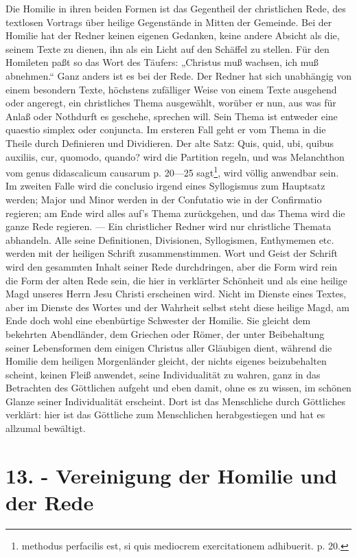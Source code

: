 Die Homilie in ihren beiden Formen ist das Gegentheil der christlichen Rede, des textlosen Vortrags über heilige Gegenstände in Mitten der Gemeinde. Bei der Homilie hat der Redner keinen eigenen Gedanken, keine andere Absicht als die, seinem Texte zu dienen, ihn als ein Licht auf den Schäffel zu stellen. Für den Homileten paßt so das Wort des Täufers: „Christus muß wachsen, ich muß abnehmen.“ Ganz anders ist es bei der Rede. Der Redner hat sich unabhängig von einem besondern Texte, höchstens zufälliger Weise von einem Texte ausgehend oder angeregt, ein christliches Thema ausgewählt, worüber er nun, aus was für Anlaß oder Nothdurft es geschehe, sprechen will. Sein Thema ist entweder eine quaestio simplex oder conjuncta. Im ersteren Fall geht er vom Thema in die Theile durch Definieren und Dividieren. Der alte Satz: Quis, quid, ubi, quibus auxiliis, cur, quomodo, quando? wird die Partition regeln, und was Melanchthon vom genus didascalicum causarum p. 20—25 sagt\footnote{methodus perfacilis est, si quis mediocrem exercitationem adhibuerit. p. 20.}, wird völlig anwendbar sein. Im zweiten Falle wird die conclusio irgend eines Syllogismus zum
Hauptsatz werden; Major und Minor werden in der Confutatio wie in der Confirmatio regieren; am Ende wird alles auf’s Thema zurückgehen, und das Thema wird die ganze Rede regieren. — Ein christlicher Redner wird nur christliche Themata abhandeln. Alle seine Definitionen, Divisionen, Syllogismen, Enthymemen etc. werden mit der heiligen Schrift zusammenstimmen. Wort und Geist der Schrift wird den gesammten Inhalt seiner Rede durchdringen, aber die Form wird rein die Form der alten Rede sein, die hier in verklärter Schönheit und als eine heilige Magd unseres Herrn Jesu Christi erscheinen wird. Nicht im Dienste eines Textes, aber im Dienste des Wortes und der Wahrheit selbst steht diese heilige Magd, am Ende doch wohl eine ebenbürtige Schwester der Homilie. Sie gleicht dem bekehrten Abendländer, dem Griechen oder Römer, der unter Beibehaltung seiner Lebensformen dem einigen Christus aller Gläubigen dient, während die Homilie dem heiligen Morgenländer gleicht, der nichts eigenes beizubehalten scheint, keinen Fleiß anwendet, seine Individualität zu wahren, ganz in das Betrachten des Göttlichen aufgeht und eben damit, ohne es zu wissen, im schönen Glanze seiner Individualität erscheint. Dort ist das Menschliche durch Göttliches verklärt: hier ist das Göttliche zum Menschlichen herabgestiegen und hat es allzumal bewältigt.

\section[13. - Vereinigung der Homilie und der Rede]{13. - Vereinigung der Homilie und der Rede}

